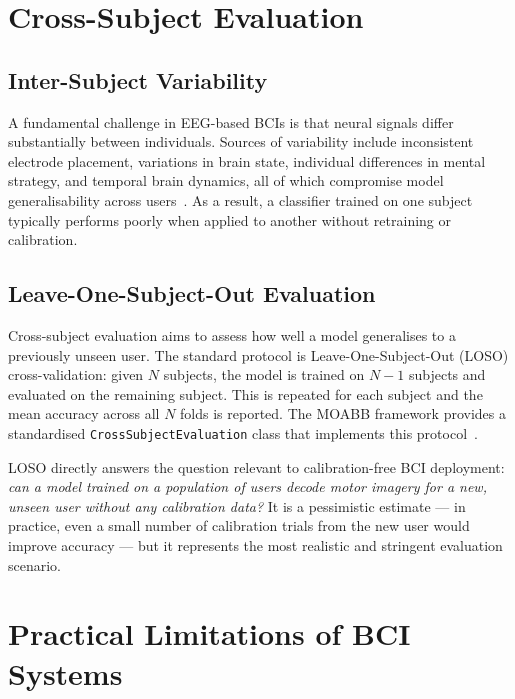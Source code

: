 \documentclass[english, bc, kiv, he, iso690alph, pdf]{fasthesis}
\begin{document}
\section{Cross-Subject Evaluation}

\subsection{Inter-Subject Variability}

A fundamental challenge in EEG-based BCIs is that neural signals differ substantially between individuals. Sources of variability include inconsistent electrode placement, variations in brain state, individual differences in mental strategy, and temporal brain dynamics, all of which compromise model generalisability across users~\cite{yadav2025decoding}. As a result, a classifier trained on one subject typically performs poorly when applied to another without retraining or calibration.

\subsection{Leave-One-Subject-Out Evaluation}

Cross-subject evaluation aims to assess how well a model generalises to a previously unseen user. The standard protocol is Leave-One-Subject-Out (LOSO) cross-validation: given $N$ subjects, the model is trained on $N-1$ subjects and evaluated on the remaining subject. This is repeated for each subject and the mean accuracy across all $N$ folds is reported. The MOABB framework provides a standardised \texttt{CrossSubjectEvaluation} class that implements this protocol~\cite{jayaram2018moabb}.

LOSO directly answers the question relevant to calibration-free BCI deployment: \textit{can a model trained on a population of users decode motor imagery for a new, unseen user without any calibration data?} It is a pessimistic estimate — in practice, even a small number of calibration trials from the new user would improve accuracy — but it represents the most realistic and stringent evaluation scenario.

\section{Practical Limitations of BCI Systems}
\end{document}
